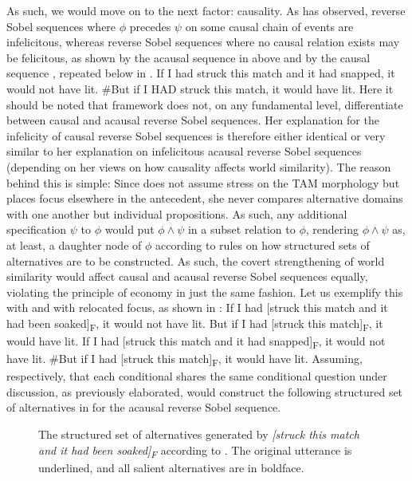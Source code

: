 As such, we would move on to the next factor: causality. As \textcite{Klecha2014} has observed, reverse Sobel sequences where $\phi$ precedes $\psi$ on some causal chain of events are infelicitous, whereas reverse Sobel sequences where no causal relation exists may be felicitous, as shown by the acausal sequence in  above and by the causal sequence , repeated below in . 
\ex{}If I had struck this match and it had snapped, it would not have lit. \#But if I \MakeUppercase{had} struck this match, it would have lit.
\xe
Here it should be noted that  framework does not, on any fundamental level, differentiate between causal and acausal reverse Sobel sequences. Her explanation for the infelicity of causal reverse Sobel sequences is therefore either identical or very similar to her explanation on infelicitous acausal reverse Sobel sequences (depending on her views on how causality affects world similarity). The reason behind this is simple: Since \textcite{Ippolito2020} does not assume stress on the TAM morphology but places focus elsewhere in the antecedent, she never compares alternative domains with one another but individual propositions. As such, any additional specification $\psi$ to $\phi$ would put $\phi\land\psi$ in a subset relation to $\phi$, rendering $\phi\land\psi$ as, at least, a daughter node of $\phi$ according to  rules on how structured sets of alternatives are to be constructed. As such, the covert strengthening of world similarity would affect causal and acausal reverse Sobel sequences equally, violating the principle of economy in just the same fashion. Let us exemplify this with  and  with relocated focus, as shown in :
\pex{}%
\a{} If I had [struck this match and it had been soaked]\textsubscript{F}, it would not have lit. But if I {had} [struck this match]\textsubscript{F}, it would have lit.
\a{} If I had [struck this match and it had snapped]\textsubscript{F}, it would not have lit. \#But if I had [struck this match]\textsubscript{F}, it would have lit.
\xe
Assuming, respectively, that each conditional shares the same conditional question under discussion, as previously elaborated, \textcite{Ippolito2020} would construct the following structured set of alternatives in  for the acausal reverse Sobel sequence.
\begin{figure}[!htb]
    \centering
    
    \caption{The structured set of alternatives generated by \textit{[struck this match and it had been soaked]\textsubscript{F}} according to \textcite{Ippolito2020}. The original utterance is underlined, and all salient alternatives are in boldface.}
\end{figure}

